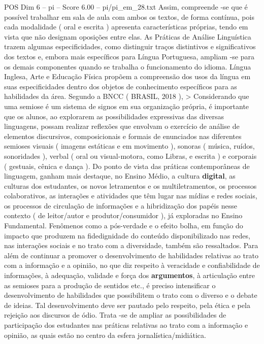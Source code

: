 \begin{textsample}{POS Dim 6 – pi – Score 6.00 – pi/pi\_em\_28.txt}
Assim, compreende -se que é possível trabalhar em sala de aula com ambos os textos, de forma contínua, pois cada modalidade ( oral e escrita ) apresenta características próprias, tendo em vista que não designam oposições entre elas.
As Práticas de Análise Linguística trazem algumas especificidades, como distinguir traços distintivos e significativos dos textos e, embora mais específicos para Língua Portuguesa, ampliam -se para os demais componentes quando se trabalha o funcionamento do idioma.
Língua Inglesa, Arte e Educação Física propõem a compreensão dos usos da língua em suas especificidades dentro dos objetos de conhecimento específicos para as habilidades da área.
Segundo a BNCC ( BRASIL, 2018 ), > Considerando que uma semiose é um sistema de signos em sua organização própria, é importante que os alunos, ao explorarem as possibilidades expressivas das diversas linguagens, possam realizar reflexões que envolvam o exercício de análise de elementos discursivos, composicionais e formais de enunciados nas diferentes semioses visuais ( imagens estáticas e em movimento ), sonoras ( música, ruídos, sonoridades ), verbal ( oral ou visual-motora, como Libras, e escrita ) e corporais ( gestuais, cênica e dança ).
Do ponto de vista das práticas contemporâneas de linguagem, ganham mais destaque, no Ensino Médio, a cultura \textbf{digital}, as culturas dos estudantes, os novos letramentos e os multiletramentos, os processos colaborativos, as interações e atividades que têm lugar nas mídias e redes sociais, os processos de circulação de informações e a hibridização dos papéis nesse contexto ( de leitor/autor e produtor/consumidor ), já exploradas no Ensino Fundamental.
Fenômenos como a pós-verdade e o efeito bolha, em função do impacto que produzem na fidedignidade do conteúdo disponibilizado nas redes, nas interações sociais e no trato com a diversidade, também são ressaltados.
Para além de continuar a promover o desenvolvimento de habilidades relativas ao trato com a informação e a opinião, no que diz respeito à veracidade e confiabilidade de informações, à adequação, validade e força dos \textbf{argumentos}, à articulação entre as semioses para a produção de sentidos etc., é preciso intensificar o desenvolvimento de habilidades que possibilitem o trato com o diverso e o debate de ideias.
Tal desenvolvimento deve ser pautado pelo respeito, pela ética e pela rejeição aos discursos de ódio.
Trata -se de ampliar as possibilidades de participação dos estudantes nas práticas relativas ao trato com a informação e opinião, as quais estão no centro da esfera jornalística/midiática.

\end{textsample}
